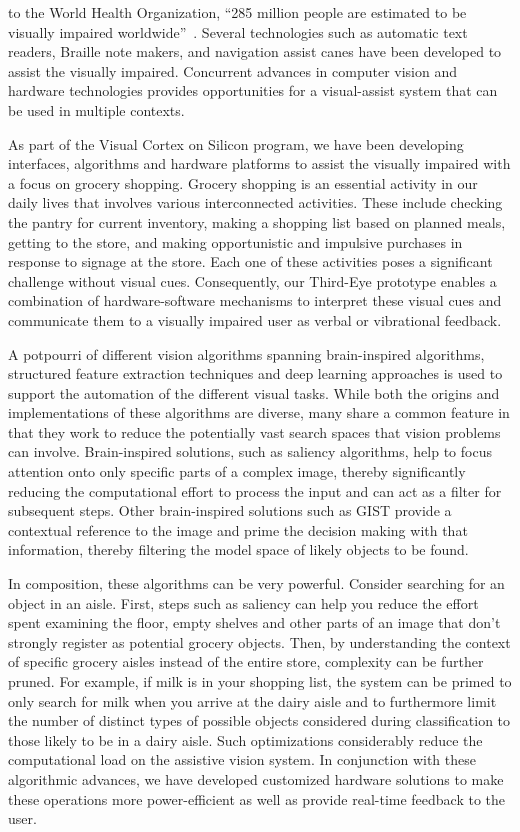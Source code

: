  to the World Health Organization, ``285 million people are estimated
to be visually impaired worldwide''~\cite{WHO}.
Several technologies such as automatic text readers, Braille note
makers, and navigation assist canes have been developed to assist the
visually impaired. Concurrent advances in computer vision and hardware
technologies provides opportunities for a visual-assist system that
can be used in multiple contexts.

As part of the Visual Cortex on Silicon program, we have been
developing interfaces, algorithms and hardware platforms to assist the
visually impaired with a focus on grocery shopping. Grocery shopping
is an essential activity in our daily lives that involves various
interconnected activities. These include checking the pantry for
current inventory, making a shopping list based on planned meals,
getting to the store, and making opportunistic and impulsive purchases
in response to signage at the store. Each one of these activities
poses a significant challenge without visual cues.  Consequently, our
Third-Eye prototype enables a combination of hardware-software
mechanisms to interpret these visual cues and communicate them to a
visually impaired user as verbal or vibrational feedback.

A potpourri of different vision algorithms spanning brain-inspired
algorithms, structured feature extraction techniques and deep learning
approaches is used to support the automation of the different visual
tasks. While both the origins and implementations of these algorithms
are diverse, many share a common feature in that they work to reduce
the potentially vast search spaces that vision problems can
involve. Brain-inspired solutions, such as saliency algorithms, help
to focus attention onto only specific parts of a complex image,
thereby significantly reducing the computational effort to process the
input and can act as a filter for subsequent steps.  Other
brain-inspired solutions such as GIST provide a contextual reference
to the image and prime the decision making with that information,
thereby filtering the model space of likely objects to be found.

In composition, these algorithms can be very powerful. Consider
searching for an object in an aisle. First, steps such as saliency can
help you reduce the effort spent examining the floor, empty shelves
and other parts of an image that don't strongly register as potential
grocery objects. Then, by understanding the context of specific
grocery aisles instead of the entire store, complexity can be further
pruned.  For example, if milk is in your shopping list, the system can
be primed to only search for milk when you arrive at the dairy aisle
and to furthermore limit the number of distinct types of possible
objects considered during classification to those likely to be in a
dairy aisle. Such optimizations considerably reduce the computational
load on the assistive vision system. In conjunction with these
algorithmic advances, we have developed customized hardware solutions
to make these operations more power-efficient as well as provide
real-time feedback to the user.

